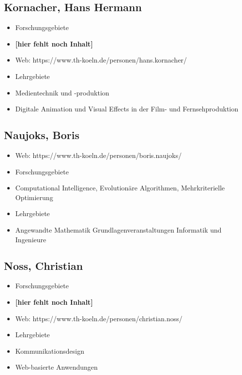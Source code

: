 \subsection{Kornacher, Hans Hermann}\label{kornacher-hans-hermann}

\begin{itemize}
\item
  Forschungsgebiete
\item
  \textbf{{[}hier fehlt noch Inhalt{]}}
\item
  Web: https://www.th-koeln.de/personen/hans.kornacher/
\item
  Lehrgebiete
\item
  Medientechnik und -produktion
\item
  Digitale Animation und Visual Effects in der Film- und
  Fernsehproduktion
\end{itemize}

\subsection{Naujoks, Boris}\label{naujoks-boris}

\begin{itemize}
\item
  Web: https://www.th-koeln.de/personen/boris.naujoks/
\item
  Forschungsgebiete
\item
  Computational Intelligence, Evolutionäre Algorithmen, Mehrkriterielle
  Optimierung
\item
  Lehrgebiete
\item
  Angewandte Mathematik Grundlagenveranstaltungen Informatik und
  Ingenieure
\end{itemize}

\subsection{Noss, Christian}\label{noss-christian}

\begin{itemize}
\tightlist
\item
  Forschungsgebiete
\item
  \textbf{{[}hier fehlt noch Inhalt{]}}
\item
  Web: https://www.th-koeln.de/personen/christian.noss/
\item
  Lehrgebiete
\item
  Kommunikationsdesign
\item
  Web-basierte Anwendungen
\end{itemize}

